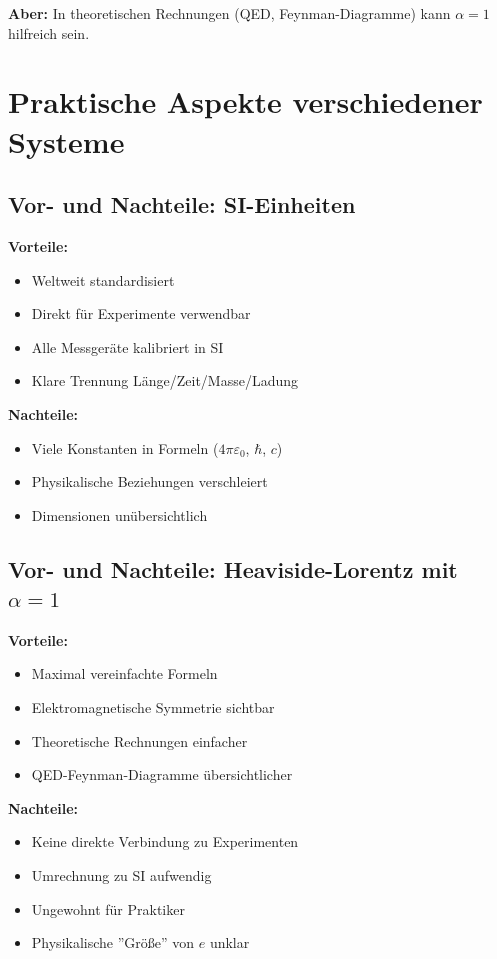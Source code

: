 	\textbf{Aber:} In theoretischen Rechnungen (QED, Feynman-Diagramme) kann $\alpha = 1$ hilfreich sein.
	
	\section{Praktische Aspekte verschiedener Systeme}
	
	\subsection{Vor- und Nachteile: SI-Einheiten}
	
	\textbf{Vorteile:}
	\begin{itemize}
		\item Weltweit standardisiert
		\item Direkt für Experimente verwendbar
		\item Alle Messgeräte kalibriert in SI
		\item Klare Trennung Länge/Zeit/Masse/Ladung
	\end{itemize}
	
	\textbf{Nachteile:}
	\begin{itemize}
		\item Viele Konstanten in Formeln ($4\pi\varepsilon_0$, $\hbar$, $c$)
		\item Physikalische Beziehungen verschleiert
		\item Dimensionen unübersichtlich
	\end{itemize}
	
	\subsection{Vor- und Nachteile: Heaviside-Lorentz mit $\alpha = 1$}
	
	\textbf{Vorteile:}
	\begin{itemize}
		\item Maximal vereinfachte Formeln
		\item Elektromagnetische Symmetrie sichtbar
		\item Theoretische Rechnungen einfacher
		\item QED-Feynman-Diagramme übersichtlicher
	\end{itemize}
	
	\textbf{Nachteile:}
	\begin{itemize}
		\item Keine direkte Verbindung zu Experimenten
		\item Umrechnung zu SI aufwendig
		\item Ungewohnt für Praktiker
		\item Physikalische ''Größe'' von $e$ unklar
	\end{itemize}
	
